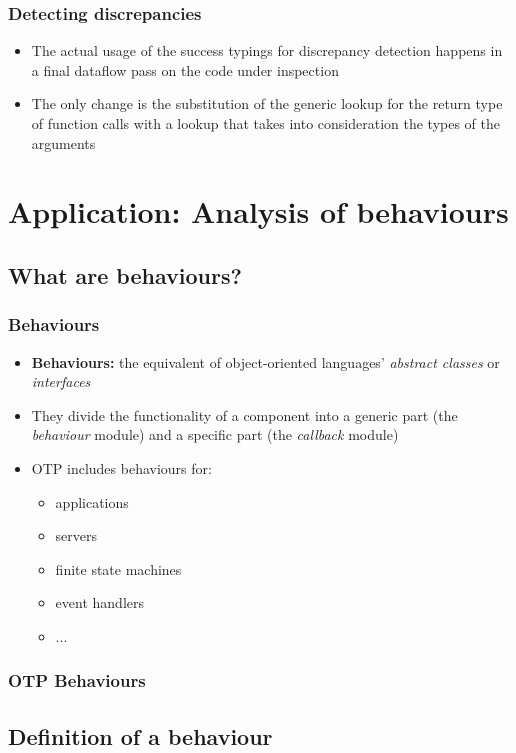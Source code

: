 \documentclass{beamer}
\begin{document}
\begin{frame}
  \frametitle{Detecting discrepancies}
  \begin{itemize}
    \item The actual usage of the success typings for discrepancy
      detection happens in a final dataflow pass on the code under
      inspection
    \item The only change is the substitution of the generic lookup
      for the return type of function calls with a lookup that takes
      into consideration the types of the arguments
  \end{itemize}
\end{frame}

\section{Application: Analysis of behaviours}

\subsection{What are behaviours?}

\begin{frame}
  \frametitle{Behaviours}
  \begin{itemize}
  \item \textbf{Behaviours:} the equivalent of object-oriented
    languages' \emph{abstract classes} or \emph{interfaces} \pause
  \item They divide the functionality of a component into a generic
    part (the \emph{behaviour} module) and a specific part (the
    \emph{callback} module) \pause
  \item OTP includes behaviours for:
    \begin{itemize}
    \item applications
    \item servers
    \item finite state machines
    \item event handlers
    \item ...
    \end{itemize}
  \end{itemize}
\end{frame}

\begin{frame}
  \frametitle{OTP Behaviours}
  
\end{frame}

\subsection{Definition of a behaviour}
\end{document}

